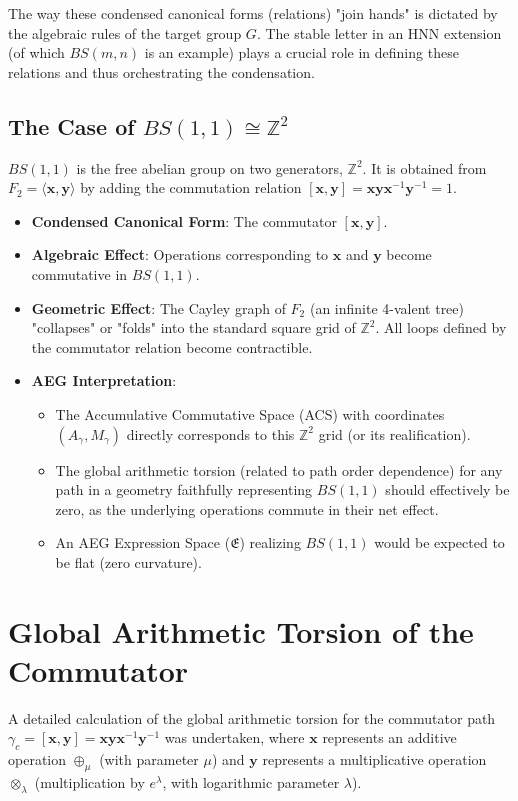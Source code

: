 \documentclass[12pt, a4paper]{article}
\theoremstyle{definition}
\begin{document}
The way these condensed canonical forms (relations) "join hands" is dictated by the algebraic rules of the target group $G$. The stable letter in an HNN extension (of which $BS(m,n)$ is an example) plays a crucial role in defining these relations and thus orchestrating the condensation.

\subsection{The Case of $BS(1,1) \cong \mathbb{Z}^2$}
$BS(1,1)$ is the free abelian group on two generators, $\mathbb{Z}^2$. It is obtained from $F_2 = \langle \mathbf{x}, \mathbf{y} \rangle$ by adding the commutation relation $[\mathbf{x},\mathbf{y}] = \mathbf{x}\mathbf{y}\mathbf{x}^{-1}\mathbf{y}^{-1} = 1$.
\begin{itemize}
    \item \textbf{Condensed Canonical Form}: The commutator $[\mathbf{x},\mathbf{y}]$.
    \item \textbf{Algebraic Effect}: Operations corresponding to $\mathbf{x}$ and $\mathbf{y}$ become commutative in $BS(1,1)$.
    \item \textbf{Geometric Effect}: The Cayley graph of $F_2$ (an infinite 4-valent tree) "collapses" or "folds" into the standard square grid of $\mathbb{Z}^2$. All loops defined by the commutator relation become contractible.
    \item \textbf{AEG Interpretation}:
        \begin{itemize}
            \item The Accumulative Commutative Space (ACS) with coordinates $(A_\gamma, M_\gamma)$ directly corresponds to this $\mathbb{Z}^2$ grid (or its realification).
            \item The global arithmetic torsion (related to path order dependence) for any path in a geometry faithfully representing $BS(1,1)$ should effectively be zero, as the underlying operations commute in their net effect.
            \item An AEG Expression Space ($\mathfrak{E}$) realizing $BS(1,1)$ would be expected to be flat (zero curvature).
        \end{itemize}
\end{itemize}

\section{Global Arithmetic Torsion of the Commutator}
A detailed calculation of the global arithmetic torsion for the commutator path $\gamma_c = [\mathbf{x},\mathbf{y}] = \mathbf{x}\mathbf{y}\mathbf{x}^{-1}\mathbf{y}^{-1}$ was undertaken, where $\mathbf{x}$ represents an additive operation $\oplus_\mu$ (with parameter $\mu$) and $\mathbf{y}$ represents a multiplicative operation $\otimes_\lambda$ (multiplication by $e^\lambda$, with logarithmic parameter $\lambda$).
\end{document}
